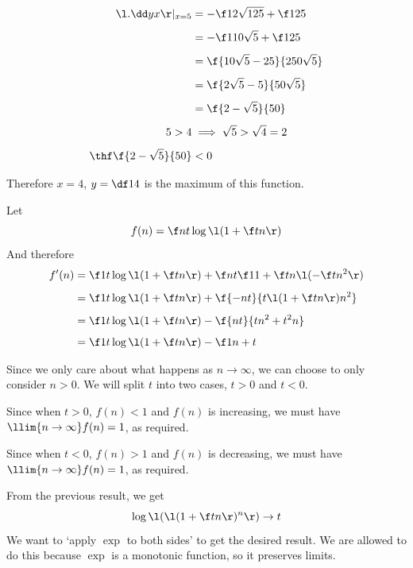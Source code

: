 \documentclass[a4paper]{article}
\begin{document}
\begin{align*}
\l. \dd yx \r|_{x=5} &= -\f1{2 \sqrt{125}} + \f1{25}\\[1ex]
&= -\f1{10 \sqrt5} + \f1{25}\\[1ex]
&= \f{10 \sqrt5 - 25}{250 \sqrt 5}\\[1ex]
&= \f{2 \sqrt5 - 5}{50 \sqrt 5}\\[1ex]
&= \f{2 - \sqrt5}{50}\\[1ex]
5 > 4 &\implies \sqrt 5 > \sqrt 4 = 2\\[1ex]
\thf \f{2 - \sqrt5}{50} &< 0
\end{align*}

Therefore $x = 4$, $y = \df14$ is the maximum of this function.



Let $$f(n) = \f nt \log\l( 1 + \f tn \r)$$
And therefore \begin{align*}
f'(n) &= \f1t \log\l( 1 + \f tn \r) + \f nt \f1{1 + \f tn} \l(-\f t{n^2}\r)\\[1ex]
&= \f1t \log\l( 1 + \f tn \r) + \f{-nt}{t \l( 1 + \f tn \r) n^2}\\[1ex]
&= \f1t \log\l( 1 + \f tn \r) - \f{nt}{tn^2 + t^2n}\\[1ex]
&= \f1t \log\l( 1 + \f tn \r) - \f1{n + t}
\end{align*}

Since we only care about what happens as $n \to \infty$, we can choose to only consider $n > 0$. We will split $t$ into two cases, $t > 0$ and $t < 0$.


Since when $t > 0$, $f(n) < 1$ and $f(n)$ is increasing, we must have $\llim{n \to \infty} f(n) = 1$, as required.


Since when $t < 0$, $f(n) > 1$ and $f(n)$ is decreasing, we must have $\llim{n \to \infty} f(n) = 1$, as required.

From the previous result, we get $$\log\l( \l( 1 + \f tn \r)^n \r) \to t$$
We want to \enquote*{apply $\exp$ to both sides} to get the desired result. We are allowed to do this because $\exp$ is a monotonic function, so it preserves limits.

\end{document}
